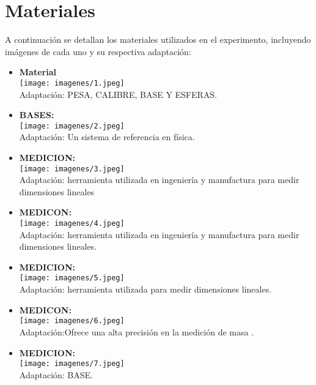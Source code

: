 \documentclass[a4paper,12pt]{article}
\begin{document}
\section{Materiales}

A continuación se detallan los materiales utilizados en el experimento, incluyendo imágenes de cada uno y su respectiva adaptación:

\begin{itemize}
    \item \textbf{Material} \\
    \texttt{[image: imagenes/1.jpeg]} \\
    Adaptación: PESA, CALIBRE, BASE Y ESFERAS.
    
    \vspace{0.5cm} %

    \item \textbf{BASES:} \\
    \texttt{[image: imagenes/2.jpeg]} \\
    Adaptación: Un sistema de referencia en física.

    \vspace{0.5cm}

    \item \textbf{MEDICION:} \\
    \texttt{[image: imagenes/3.jpeg]} \\
    Adaptación: herramienta utilizada en ingeniería y manufactura para medir dimensiones lineales

    \vspace{0.5cm}

    \item \textbf{MEDICON:} \\
    \texttt{[image: imagenes/4.jpeg]} \\
    Adaptación: herramienta utilizada en ingeniería y manufactura para medir dimensiones lineales.

    \vspace{0.5cm}

    \item \textbf{MEDICION:} \\
    \texttt{[image: imagenes/5.jpeg]} \\
    Adaptación: herramienta utilizada para medir dimensiones lineales.

    \vspace{0.5cm}

    \item \textbf{MEDICON:} \\
    \texttt{[image: imagenes/6.jpeg]} \\
    Adaptación:Ofrece una alta precisión en la medición de masa .

    \vspace{0.5cm}

    \item \textbf{MEDICION:} \\
    \texttt{[image: imagenes/7.jpeg]} \\
    Adaptación: BASE.
\end{itemize}
\end{document}
